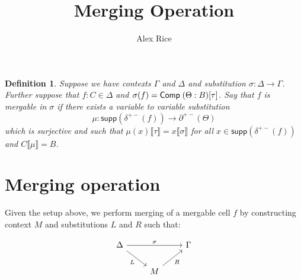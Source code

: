 \documentclass[draft]{article}
\title{Merging Operation} \author{Alex Rice}
\newtheorem{definition}[theorem]{Definition} \theoremstyle{remark}
\newcommand*{\Comp}[3]{\ensuremath\mathsf{Comp}\;(#1:#2)[#3]}
\newcommand*{\sub}[2]{\ensuremath{#1\llbracket #2 \rrbracket}}
\newcommand*{\supp}{\ensuremath{\mathsf{supp}}}
\begin{document}
\maketitle

\begin{definition}
  Suppose we have contexts \(\Gamma\) and \(\Delta\) and substitution \(\sigma : \Delta \to \Gamma\). Further suppose that \(f : C \in \Delta\) and \(\sigma(f) = \Comp \Theta B \tau\). Say that \(f\) is \emph{mergable} in \(\sigma\) if there exists a variable to variable substitution
  \[ \mu : \supp(\delta^{+-}(f)) \to \partial^{+-}(\Theta)\]
  which is surjective and such that \(\sub{\mu(x)}\tau = \sub x \sigma\) for all \(x \in \supp(\delta^{+-}(f))\) and \(\sub C \mu = B\).
\end{definition}

\section{Merging operation}
\label{sec:merging}

Given the setup above, we perform merging of a mergable cell \(f\) by constructing context \(M\) and substitutions \(L\) and \(R\) such that:

\begin{equation}
\begin{tikzcd}
  \Delta && \Gamma \\
  & M
  \arrow["L"', from=1-1, to=2-2]
  \arrow["R"', from=2-2, to=1-3]
  \arrow["\sigma", from=1-1, to=1-3]
\end{tikzcd}\label{eq:triangle}
\end{equation}
\end{document}
